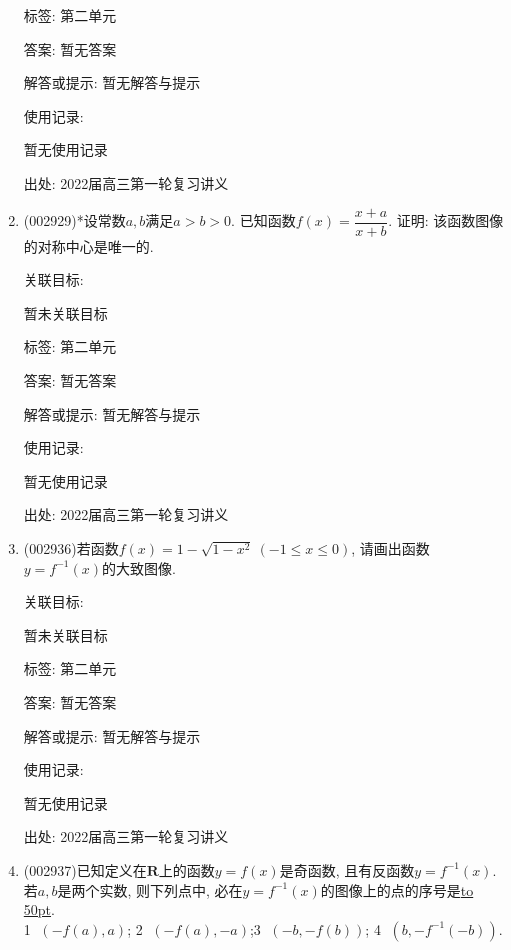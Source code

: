 \documentclass[10pt,a4paper]{article}
\newcommand{\blank}[1]{\underline{\hbox to #1pt{}}}
\begin{document}
\begin{enumerate}[1.]
标签: 第二单元

答案: 暂无答案

解答或提示: 暂无解答与提示

使用记录:

暂无使用记录


出处: 2022届高三第一轮复习讲义
\item { (002929)}*设常数$a,b$满足$a>b>0$. 已知函数$f(x)=\dfrac{x+a}{x+b}$. 证明: 该函数图像的对称中心是唯一的.


关联目标:

暂未关联目标



标签: 第二单元

答案: 暂无答案

解答或提示: 暂无解答与提示

使用记录:

暂无使用记录


出处: 2022届高三第一轮复习讲义
\item { (002936)}若函数$f(x)=1-\sqrt{1-x^2}\ (-1\le x\le 0)$,
请画出函数$y={f^{-1}}(x)$的大致图像.
\begin{center}
\end{center}


关联目标:

暂未关联目标



标签: 第二单元

答案: 暂无答案

解答或提示: 暂无解答与提示

使用记录:

暂无使用记录


出处: 2022届高三第一轮复习讲义
\item { (002937)}已知定义在$\mathbf{R}$上的函数$y=f(x)$是奇函数, 且有反函数$y=f^{-1}(x)$. 若$a,b$是两个实数, 则下列点中, 必在$y=f^{-1}(x)$的图像上的点的序号是\blank{50}.\\
\textcircled{1} $(-f(a),a)$; \textcircled{2} $(-f(a),-a)$;\textcircled{3} $(-b,-f(b))$; \textcircled{4} $(b,-f^{-1}(-b))$.



\end{enumerate}
\end{document}
